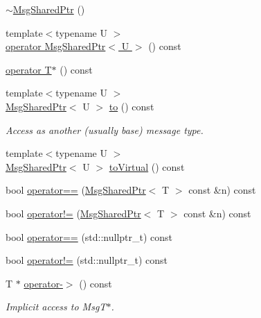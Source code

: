\begin{DoxyCompactItemize}
\item 
\hyperlink{structvt_1_1messaging_1_1_msg_shared_ptr_a41b62019acea0627ce3297d31257524c}{$\sim$\+Msg\+Shared\+Ptr} ()
\item 
{\footnotesize template$<$typename U $>$ }\\\hyperlink{structvt_1_1messaging_1_1_msg_shared_ptr_a984ff1a806b338a5fce6fc1861fd0198}{operator Msg\+Shared\+Ptr$<$ U $>$} () const
\item 
\hyperlink{structvt_1_1messaging_1_1_msg_shared_ptr_a85b58c8af4068d8cfd4ad2ebb02d8111}{operator T$\ast$} () const
\item 
{\footnotesize template$<$typename U $>$ }\\\hyperlink{structvt_1_1messaging_1_1_msg_shared_ptr}{Msg\+Shared\+Ptr}$<$ U $>$ \hyperlink{structvt_1_1messaging_1_1_msg_shared_ptr_ae3d838b37f94f5f63ffc433518d46ada}{to} () const
\begin{DoxyCompactList}\small\item\em Access as another (usually base) message type. \end{DoxyCompactList}\item 
{\footnotesize template$<$typename U $>$ }\\\hyperlink{structvt_1_1messaging_1_1_msg_shared_ptr}{Msg\+Shared\+Ptr}$<$ U $>$ \hyperlink{structvt_1_1messaging_1_1_msg_shared_ptr_ab210c87a0489113368209634e76a72b8}{to\+Virtual} () const
\item 
bool \hyperlink{structvt_1_1messaging_1_1_msg_shared_ptr_a7f385be5d82602555a25a6737c779962}{operator==} (\hyperlink{structvt_1_1messaging_1_1_msg_shared_ptr}{Msg\+Shared\+Ptr}$<$ T $>$ const \&n) const
\item 
bool \hyperlink{structvt_1_1messaging_1_1_msg_shared_ptr_a1a37a82a49f68a91ef92ec675d2a324e}{operator!=} (\hyperlink{structvt_1_1messaging_1_1_msg_shared_ptr}{Msg\+Shared\+Ptr}$<$ T $>$ const \&n) const
\item 
bool \hyperlink{structvt_1_1messaging_1_1_msg_shared_ptr_a7da24c983c0b606a570138d928148298}{operator==} (std\+::nullptr\+\_\+t) const
\item 
bool \hyperlink{structvt_1_1messaging_1_1_msg_shared_ptr_a3d21051f673b7370ac6dcdaeac110e84}{operator!=} (std\+::nullptr\+\_\+t) const
\item 
T $\ast$ \hyperlink{structvt_1_1messaging_1_1_msg_shared_ptr_a4140dc4ea157de37d258c8f8821179c8}{operator-\/$>$} () const
\begin{DoxyCompactList}\small\item\em Implicit access to Msg\+T$\ast$. \end{DoxyCompactList}\item 

\end{DoxyCompactItemize}
